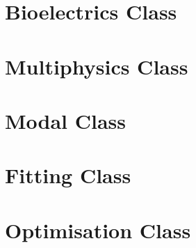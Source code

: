 \section{Bioelectrics Class}
\clearpage

\clearpage

%

\section{Multiphysics Class}



\section{Modal Class}
\clearpage

\section{Fitting Class}

\clearpage

\section{Optimisation Class}
\clearpage
